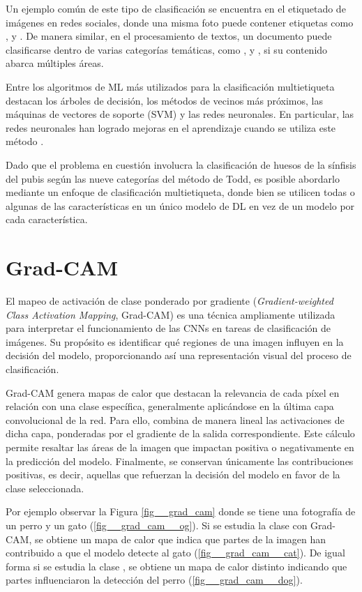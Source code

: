Un ejemplo común de este tipo de clasificación se encuentra en el etiquetado de imágenes en redes sociales, donde una misma foto puede contener etiquetas como ,  y . De manera similar, en el procesamiento de textos, un documento puede clasificarse dentro de varias categorías temáticas, como ,  y , si su contenido abarca múltiples áreas.

Entre los algoritmos de ML más utilizados para la clasificación multietiqueta destacan los árboles de decisión, los métodos de vecinos más próximos, las máquinas de vectores de soporte (SVM) y las redes neuronales. En particular, las redes neuronales han logrado mejoras en el aprendizaje cuando se utiliza este método \cite{ranjan_hyperface_2019}.

Dado que el problema en cuestión involucra la clasificación de huesos de la sínfisis del pubis según las nueve categorías del método de Todd, es posible abordarlo mediante un enfoque de clasificación multietiqueta, donde bien se utilicen todas o algunas de las características en un único modelo de DL en vez de un modelo por cada característica.

\section{Grad-CAM}
El mapeo de activación de clase ponderado por gradiente (\textit{Gradient-weighted Class Activation Mapping}, Grad-CAM) \cite{selvaraju_grad_cam_2017} es una técnica ampliamente utilizada para interpretar el funcionamiento de las CNNs en tareas de clasificación de imágenes. Su propósito es identificar qué regiones de una imagen influyen en la decisión del modelo, proporcionando así una representación visual del proceso de clasificación.

Grad-CAM genera mapas de calor que destacan la relevancia de cada píxel en relación con una clase específica, generalmente aplicándose en la última capa convolucional de la red. Para ello, combina de manera lineal las activaciones de dicha capa, ponderadas por el gradiente de la salida correspondiente. Este cálculo permite resaltar las áreas de la imagen que impactan positiva o negativamente en la predicción del modelo. Finalmente, se conservan únicamente las contribuciones positivas, es decir, aquellas que refuerzan la decisión del modelo en favor de la clase seleccionada.

Por ejemplo observar la Figura \ref{fig__grad_cam} donde se tiene una fotografía de un perro y un gato (\ref{fig__grad_cam__og}). Si se estudia la clase  con Grad-CAM, se obtiene un mapa de calor que indica que partes de la imagen han contribuido a que el modelo detecte al gato (\ref{fig__grad_cam__cat}). De igual forma si se estudia la clase , se obtiene un mapa de calor distinto indicando que partes influenciaron la detección del perro (\ref{fig__grad_cam__dog}).

